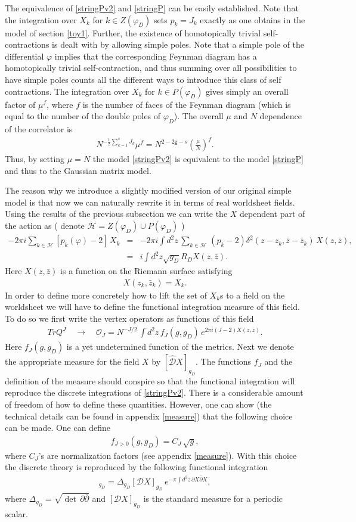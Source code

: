\documentclass[11pt]{JHEP3}
\def\be{\begin{eqnarray}}
\def\ee{\end{eqnarray}}
\def\half{\frac{1}{2}}
\def\d{\partial}
\def\vf{\varphi}
\def\gg{\mathsf g }
\begin{document}
The equivalence of \eqref{stringPv2} and \eqref{stringP} can be easily established.
Note that the integration over $X_k$ for $k\in Z(\vf_D)$ sets $p_k=J_k$ exactly as 
one obtains in the model of section \ref{toy1}.
Further, the existence of homotopically trivial self-contractions
is dealt with by allowing simple poles. Note that a simple pole of the differential $\vf$ 
implies that the corresponding Feynman diagram has a homotopically trivial self-contraction,
and thus summing over all possibilities to have simple poles counts all the different ways
to introduce this class of self contractions.
  The integration over $X_k$ for $k\in P(\vf_D)$
gives simply an overall factor of $\mu^{f}$, where $f$ is the number of faces of the Feynman
 diagram (which is equal to the number of the double poles of $\vf_D$). The overall $\mu$ and $N$ dependence of the correlator is
\be
N^{-\half\sum_{k=1}^sJ_k}\mu^{f}=N^{2-2\gg-s}\left(\frac{\mu}{N}\right)^f.
\ee Thus, by setting $\mu=N$ the model \eqref{stringPv2} is equivalent to
the model \eqref{stringP} and thus to the Gaussian matrix model.


The reason why we introduce a slightly modified version of our original simple model
is that now we can naturally rewrite it in terms of real worldsheet fields.
Using the results of the previous subsection we can write the $X$ dependent part of the action as
( denote ${\mathcal H}=Z(\vf_D)\cup P(\vf_D)$ )
\be\label{Xint}
-2\pi i\sum_{k\in {\mathcal H}} \left[p_k(\vf)-2\right]\,X_k&=&-2\pi i\int d^2z\, \sum_{k\in {\mathcal H}}\, (p_k-2)\delta^2(z-z_k,\bar z-\bar z_k)\, X(z,\bar z),\nonumber\\
&=& i \int d^2z \sqrt{g_D}R_D X(z,\bar z).
\ee Here $X(z,\bar z)$ is a function on the Riemann surface satisfying
\be
X(z_k,\bar z_k)=X_k.
\ee  In order to define more concretely how to lift the set of $X_k$s to a field
on the worldsheet we will have to define the functional integration measure of this field.
To do so we first write the vertex operators as functions of this field
\be\label{opZCCM2}
TrQ^{J}\quad\to\quad {\mathcal O}_J=
 N^{-J/2}\,
\int d^2z\,f_J(g,g_D)\,e^{2\pi i(J-2)X(z,\bar z)}.\nonumber
\ee  Here $f_J(g,g_D)$ is a yet undetermined function of the metrics.  
Next we denote the appropriate measure for the field $X$ by $[\hat{\mathcal D}X]_{g_D}$.
The functions $f_J$ and the definition of the measure should conspire so that
the functional integration will reproduce the discrete integrations of  \eqref{stringPv2}. 
There is a considerable amount of freedom of how to define these quantities. However,
one can show (the technical details can be found in appendix \ref{measure}) that the
following choice can be made. One can  define
\be 
f_{J>0}(g,g_D)=C_J\,\sqrt{g},
\ee where $C_J$'s are normalization factors (see appendix \ref{measure}).
With this choice the discrete theory is reproduced by the following functional integration
\be
[\hat{\mathcal D}X]_{g_D}=\Delta_{g_D}[{\mathcal D}X]_{g_D}\,e^{-\pi\int d^2z\,\d X\bar\d X},
\ee where $\Delta_{g_D}=\sqrt{\det\,\d\bar\d}$ and $[{\mathcal D}X]_{g_D}$ is the standard measure
for a periodic scalar. 
\end{document}
